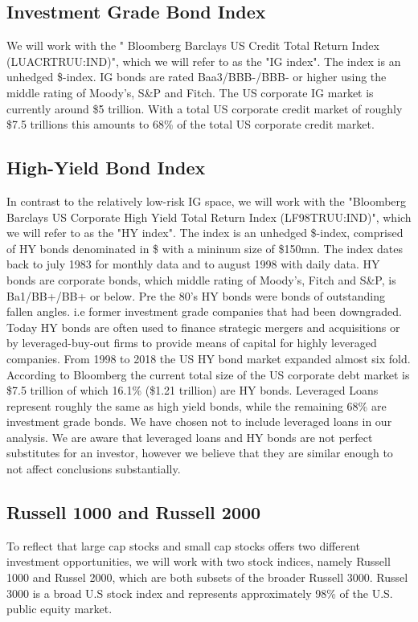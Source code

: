 \documentclass[11pt,a4paper,oneside]{article}
\begin{document}
\subsection*{Investment Grade Bond Index}
\noindent We will work with the " Bloomberg Barclays US Credit Total Return Index (LUACRTRUU:IND)", which we will refer to as the "IG index". The index is an unhedged \$-index. IG bonds are rated Baa3/BBB-/BBB- or higher using the middle rating of Moody's, S\&P and Fitch. The US corporate IG market is currently around \$5 trillion. With a total US corporate credit market of roughly \$7.5 trillions this amounts to 68\% of the total US corporate credit market\cite{Bloomberg}. 

\subsection*{High-Yield Bond Index}
\noindent In contrast to the relatively low-risk IG space, we will work with the "Bloomberg Barclays US Corporate High Yield Total Return Index (LF98TRUU:IND)", which we will refer to as the "HY index". The index is an unhedged \$-index, comprised of HY bonds denominated in \$ with a mininum size of \$150mn. The index dates back to july 1983 for monthly data and to august 1998 with daily data. HY bonds are corporate bonds, which middle rating of Moody's, Fitch and S\&P, is Ba1/BB+/BB+ or below. Pre the 80's HY bonds were bonds of outstanding fallen angles. i.e former investment grade companies that had been downgraded. Today HY bonds are often used to finance strategic mergers and acquisitions or  by leveraged-buy-out firms to provide means of capital for highly leveraged companies. From 1998 to 2018 the US HY bond market expanded almost six fold\cite{Pimco}. According to Bloomberg the current total size of the US corporate debt market is \$7.5 trillion of which 16.1\% (\$1.21 trillion) are HY bonds. Leveraged Loans represent roughly the same as high yield bonds, while the remaining 68\% are investment grade bonds\cite{Bloomberg}. We have chosen not to include leveraged loans in our analysis. We are aware that leveraged loans and HY bonds are not perfect substitutes for an investor, however we believe that they are similar enough to not affect conclusions substantially.         

\subsection*{Russell 1000 and Russell 2000}
\noindent To reflect that large cap stocks and small cap stocks offers two different investment opportunities, we will work with two stock indices, namely Russell 1000 and Russel 2000, which are both subsets of the broader Russell 3000. Russel 3000 is a broad U.S stock index and represents approximately 98\% of the U.S. public equity market.     
\end{document}
